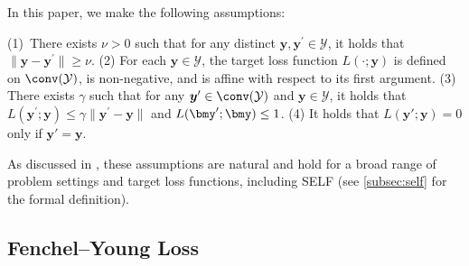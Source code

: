 In this paper, we make the following assumptions:
\begin{assumption}
    \label{asp:online_structured_prediction}
    (1)~There exists $\nu>0$ such that for any distinct $\bm{y},\bm{y}^\prime\in \mathcal{Y}$, it holds that $\|\bm{y}-\bm{y}^\prime\|\geq\nu$.  
    (2) For each $\bm{y}\in\mathcal{Y}$, the target loss function $L(\cdot;\bm{y})$ is defined on $\conv(\mathcal{Y})$, is non-negative, and is affine with respect to its first argument.  
    (3) There exists $\gamma$ such that for any $\bm{y}^\prime\in\conv(\mathcal{Y})$ and $\bm{y}\in\mathcal{Y}$, it holds that $L(\bm{y}^\prime;\bm{y})\leq\gamma\|\bm{y}^\prime-\bm{y}\|$ and $L(\bmy^{\prime};\bmy)\leq 1$. 
    (4) It holds that $L(\bm{y}'; \bm{y})=0$ only if $\bm{y}'=\bm{y}$.
\end{assumption}

As discussed in \citet[Section 2.3]{pmlr-v247-sakaue24a}, these assumptions are natural and hold for a broad range of problem settings and target loss functions, including SELF (see \cref{subsec:self} for the formal definition).


\subsection{Fenchel--Young Loss}\label{subsec:fenchel-young}

